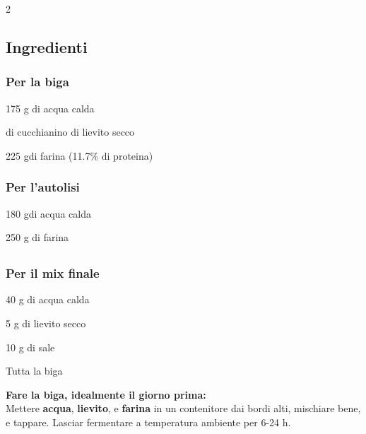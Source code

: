 \newpage
{}

\begin{multicols}{2}
	\subsection*{Ingredienti}
	
	\subsubsection*{Per la biga}
	\begin{ingredients}
		\item 175 g di acqua calda
		\item {} di cucchianino di lievito secco
		\item 225 gdi farina (11.7\% di proteina)
	\end{ingredients}
	
	\subsubsection*{Per l'autolisi}
	\begin{ingredients}
		\item 180 gdi acqua calda
		\item 250 g di farina
	\end{ingredients}
	\columnbreak
	\subsection*{ }
	
	\subsubsection*{Per il mix finale}
	\begin{ingredients}
		\item 40 g di acqua calda
		\item 5 g di lievito secco
		\item 10 g di sale
		\item Tutta la biga
	\end{ingredients}
\end{multicols}

\textbf{Fare la biga, idealmente il giorno prima:} \\
Mettere \textbf{acqua}, \textbf{lievito}, e \textbf{farina} in un contenitore dai bordi alti, mischiare bene, e tappare.
Lasciar fermentare a temperatura ambiente per 6-24 h.

